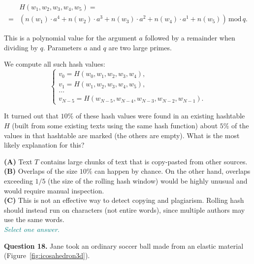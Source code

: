 \documentclass[jou]{apa6}
\begin{document}
{\footnotesize
\begin{align}
 & H(w_1,w_2,w_3,w_4,w_5) = \nonumber \\
= & \left( n(w_1) \cdot a^4 + n(w_2) \cdot a^3 + n(w_3) \cdot a^2 + n(w_4) \cdot a^1 + n(w_5) \right)\, \text{mod}\,q. \nonumber
\end{align}
}


This is a polynomial value for the argument $a$ followed by a remainder when dividing by $q$.
Parameters $a$ and $q$ are two large primes.

We compute all such hash values:
$$\left\{ \begin{array}{l}
v_0 = H(w_0,w_1,w_2,w_3,w_4),\\
v_1 = H(w_1,w_2,w_3,w_4,w_5),\\
\ldots\\
v_{N-5} = H(w_{N-5},w_{N-4},w_{N-3},w_{N-2},w_{N-1}).
\end{array} \right.$$

It turned out that $10\%$ of these hash values were found in an existing
hashtable $H$ (built from some existing texts using the same hash function) \textendash{}
about $5\%$ of the values in that hashtable are marked (the others are empty).
What is the most likely explanation for this? 

{\bf (A)} Text $T$ contains large chunks of text that is copy-pasted from other sources.\\
{\bf (B)} Overlaps of the size $10\%$ can happen by chance. On the other hand, overlaps
exceeding $1/5$ (the size of the rolling hash window) would be highly unusual and 
would require manual inspection.\\
{\bf (C)} This is not an effective way to detect copying and plagiarism.
Rolling hash should instead run on characters (not entire words),
since multiple authors may use the same words.\\
\textcolor{teal}{\em Select one answer.}





\vspace{10pt} 
{\bf Question 18.} Jane took an ordinary soccer ball made from an elastic material
(Figure~\ref{fig:icosahedron3d}).


\begin{figure}[!htb]
\end{figure}
\end{document}
